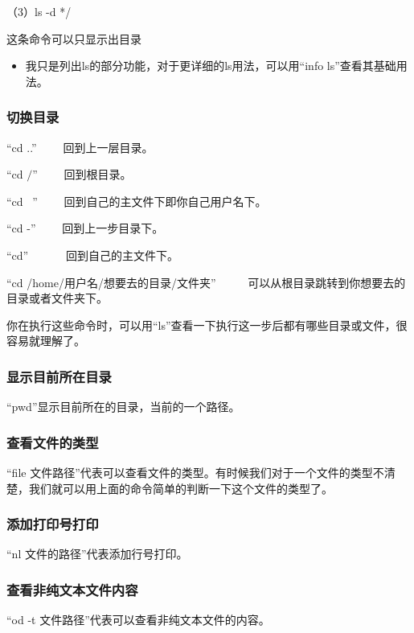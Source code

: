 \documentclass{article}
\begin{document}
（3）ls -d */

这条命令可以只显示出目录
\begin{itemize}
\item 我只是列出ls的部分功能，对于更详细的ls用法，可以用“info ls”查看其基础用法。
\end{itemize}
\subsubsection{切换目录}
“cd ..” ~~~~回到上一层目录。

“cd $\slash$”  ~~~~回到根目录。

“cd ~”  ~~~~回到自己的主文件下即你自己用户名下。

“cd -”  ~~~~回到上一步目录下。

“cd”    ~~~~~~回到自己的主文件下。

“cd /home/用户名/想要去的目录/文件夹”  ~~~~~可以从根目录跳转到你想要去的目录或者文件夹下。

你在执行这些命令时，可以用“ls”查看一下执行这一步后都有哪些目录或文件，很容易就理解了。
\subsubsection{显示目前所在目录}

“pwd”显示目前所在的目录，当前的一个路径。


\subsubsection{查看文件的类型}
“file 文件路径”代表可以查看文件的类型。有时候我们对于一个文件的类型不清楚，我们就可以用上面的命令简单的判断一下这个文件的类型了。
\subsubsection{添加打印号打印}
“nl 文件的路径”代表添加行号打印。
\subsubsection{查看非纯文本文件内容} 
“od -t 文件路径”代表可以查看非纯文本文件的内容。
\end{document}
